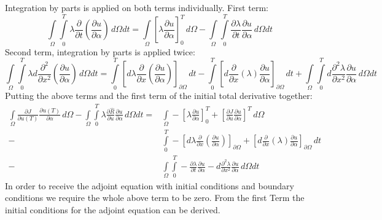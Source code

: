 Integration by parts is applied on both terms individually. First term:
\begin{equation}
\int\limits_{\Omega}\int\limits_{0}^{T} \lambda \frac{\partial}{\partial t} \left( \frac{\partial u}{\partial \alpha} \right) \,d\Omega dt =
\int\limits_{\Omega} \left[ \lambda \frac{\partial u}{\partial \alpha} \right]_{0}^{T} \,d\Omega 
- \int\limits_{\Omega}\int\limits_{0}^{T} \frac{\partial \lambda}{\partial t} \frac{\partial u}{\partial \alpha} \,d\Omega dt
\end{equation}
Second term, integration by parts is applied twice:
\begin{equation}
\int\limits_{\Omega}\int\limits_{0}^{T} \lambda d \frac{\partial^2}{\partial x^2} \left( \frac{\partial u}{\partial \alpha} \right) \,d\Omega dt = 
\int\limits_{0}^{T} \left[ d \lambda \frac{\partial}{\partial x} \left( \frac{\partial u}{\partial \alpha} \right) \right]_{\partial\Omega}  \,dt
- \int\limits_{0}^{T} \left[ d \frac{\partial}{\partial x} \left(\lambda \right) \frac{\partial u}{\partial \alpha} \right]_{\partial\Omega} \,dt
+ \int\limits_{\Omega}\int\limits_{0}^{T} d \frac{\partial^2 \lambda}{\partial x^2}  \frac{\partial u}{\partial \alpha} \,d\Omega dt
\end{equation}
Putting the above terms and the first term of the initial total derivative together:
\begin{align}
\int\limits_{\Omega} \frac{\partial J}{\partial u(T)} \frac{\partial u(T)}{\partial \alpha}  \,d\Omega - \int\limits_{\Omega}\int\limits_{0}^{T} \lambda \frac{\partial \hat{R}}{\partial u} \frac{\partial u}{\partial \alpha} \,d\Omega dt = 
&\int\limits_{\Omega} -\left[ \lambda \frac{\partial u}{\partial \alpha} \right]_{0}^{T} 
+ \left[ \frac{\partial J}{\partial u} \frac{\partial u}{\partial \alpha}\right]^T \,d\Omega \\
- &\int\limits_{0}^{T} -\left[ d \lambda \frac{\partial}{\partial x}\left( \frac{\partial u}{\partial \alpha} \right) \right]_{\partial\Omega} 
+ \left[ d \frac{\partial}{\partial x} \left( \lambda\right) \frac{\partial u}{\partial \alpha} \right]_{\partial\Omega} \,dt \\
- &\int\limits_{\Omega}\int\limits_{0}^{T} - \frac{\partial \lambda}{\partial t} \frac{\partial u}{\partial \alpha} - d \frac{\partial^2 \lambda}{\partial x^2}  \frac{\partial u}{\partial \alpha} \,d\Omega dt 
\end{align}
In order to receive the adjoint equation with initial conditions and boundary conditions we require the whole above term to be zero. From the first Term the initial conditions for the adjoint equation can be derived.

